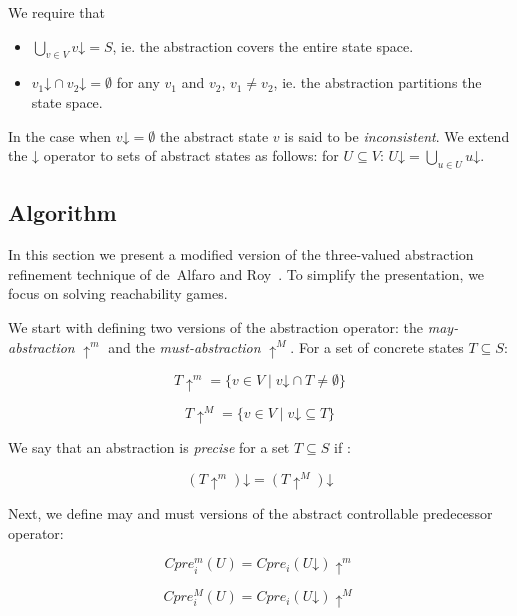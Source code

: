\documentclass[a4paper,twoside,openright,11pt]{book}
\newcommand{\concrete}[1]{#1\mathord{\downarrow}}
\newcommand{\abstractm}[1]{#1\mathord{\uparrow^m}}
\newcommand{\abstractM}[1]{#1\mathord{\uparrow^M}}
\theoremstyle{definition}
\begin{document}
We require that 
\begin{itemize}
    \item $\bigcup_{v\in V}\concrete{v} = S$, ie. the abstraction covers the entire state space. 
    \item $\concrete{v_1}\cap \concrete{v_2} = \emptyset$ for any $v_1$ and $v_2$, $v_1 \neq v_2$, ie. the abstraction partitions the state space.
\end{itemize}

In the case when $\concrete{v} = \emptyset$ the abstract state $v$ is said to be \emph{inconsistent}. We extend the $\concrete{}$ operator to sets of abstract states as follows: for $U\subseteq V$: $\concrete{U} = \bigcup_{u\in U}\concrete{u}$.

\subsection{Algorithm}
In this section we present a modified version of the three-valued abstraction refinement technique of de~Alfaro and Roy~\cite{Alfaro_Roy_07}. To simplify the presentation, we focus on solving reachability games. 

We start with defining two versions of the abstraction operator: the \emph{may-abstraction} $\abstractm{}$ and the \emph{must-abstraction} $\abstractM{}$. For a set of concrete states $T \subseteq S$:

\begin{equation}
\abstractm{T} = \{v\in V\mid \concrete{v} \cap T \neq \emptyset\} 
\end{equation}

\begin{equation}
\abstractM{T} = \{v\in V\mid \concrete{v} \subseteq T \}
\end{equation}

We say that an abstraction is \emph{precise} for a set $T\subseteq S$ if :

\begin{equation}
\concrete{(\abstractm{T})} = \concrete{(\abstractM{T})}
\end{equation}

Next, we define may and must versions of the abstract controllable predecessor operator:

\begin{equation}
    Cpre_i^m(U) = \abstractm{Cpre_i(\concrete{U})}
\end{equation}

\begin{equation}
    Cpre_i^M(U) = \abstractM{Cpre_i(\concrete{U})}
\end{equation}
\end{document}
